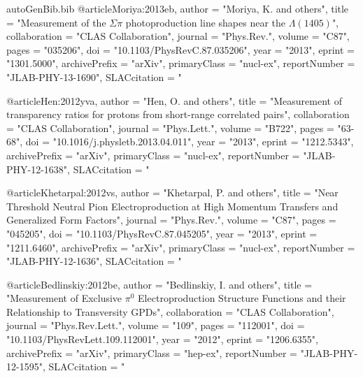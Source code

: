 \begin{filecontents*}{autoGenBib.bib}
@article{Moriya:2013eb,
      author         = "Moriya, K. and others",
      title          = "{Measurement of the $\Sigma \pi$ photoproduction line
                        shapes near the $\Lambda(1405)$}",
      collaboration  = "CLAS Collaboration",
      journal        = "Phys.Rev.",
      volume         = "C87",
      pages          = "035206",
      doi            = "10.1103/PhysRevC.87.035206",
      year           = "2013",
      eprint         = "1301.5000",
      archivePrefix  = "arXiv",
      primaryClass   = "nucl-ex",
      reportNumber   = "JLAB-PHY-13-1690",
      SLACcitation   = "%
}

@article{Hen:2012yva,
      author         = "Hen, O. and others",
      title          = "{Measurement of transparency ratios for protons from
                        short-range correlated pairs}",
      collaboration  = "CLAS Collaboration",
      journal        = "Phys.Lett.",
      volume         = "B722",
      pages          = "63-68",
      doi            = "10.1016/j.physletb.2013.04.011",
      year           = "2013",
      eprint         = "1212.5343",
      archivePrefix  = "arXiv",
      primaryClass   = "nucl-ex",
      reportNumber   = "JLAB-PHY-12-1638",
      SLACcitation   = "%
}

@article{Khetarpal:2012vs,
      author         = "Khetarpal, P. and others",
      title          = "{Near Threshold Neutral Pion Electroproduction at High
                        Momentum Transfers and Generalized Form Factors}",
      journal        = "Phys.Rev.",
      volume         = "C87",
      pages          = "045205",
      doi            = "10.1103/PhysRevC.87.045205",
      year           = "2013",
      eprint         = "1211.6460",
      archivePrefix  = "arXiv",
      primaryClass   = "nucl-ex",
      reportNumber   = "JLAB-PHY-12-1636",
      SLACcitation   = "%
}

@article{Bedlinskiy:2012be,
      author         = "Bedlinskiy, I. and others",
      title          = "{Measurement of Exclusive $\pi^0$ Electroproduction
                        Structure Functions and their Relationship to Transversity
                        GPDs}",
      collaboration  = "CLAS Collaboration",
      journal        = "Phys.Rev.Lett.",
      volume         = "109",
      pages          = "112001",
      doi            = "10.1103/PhysRevLett.109.112001",
      year           = "2012",
      eprint         = "1206.6355",
      archivePrefix  = "arXiv",
      primaryClass   = "hep-ex",
      reportNumber   = "JLAB-PHY-12-1595",
      SLACcitation   = "%
}


\end{filecontents*}
